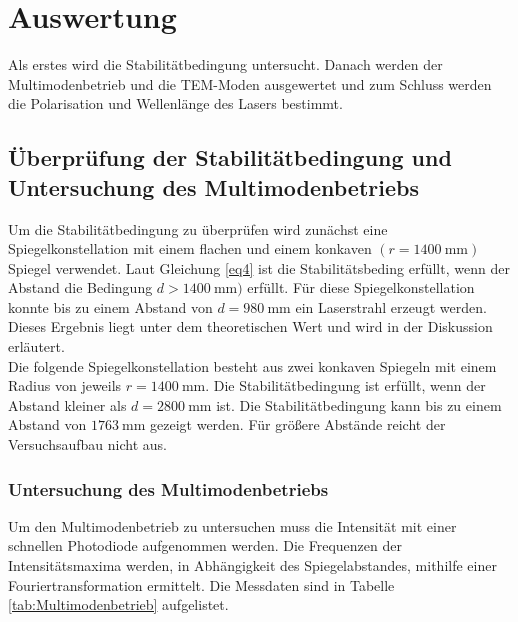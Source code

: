 \section{Auswertung}
\label{sec:Auswertung}

Als erstes wird die Stabilitätbedingung untersucht. Danach werden der 
Multimodenbetrieb und die TEM-Moden ausgewertet und zum Schluss werden 
die Polarisation und Wellenlänge des Lasers bestimmt.

\subsection{Überprüfung der Stabilitätbedingung und Untersuchung des Multimodenbetriebs}

Um die Stabilitätbedingung zu überprüfen wird zunächst eine Spiegelkonstellation mit einem flachen 
und einem konkaven $(r=\SI{1400}{\milli\meter})$ Spiegel verwendet. Laut Gleichung \eqref{eq4} ist die 
Stabilitätsbeding erfüllt, wenn der Abstand die Bedingung $d>\SI{1400}{\milli\meter})$ erfüllt.
Für diese Spiegelkonstellation konnte bis zu einem Abstand von $d=\SI{980}{\milli\meter}$ ein Laserstrahl erzeugt werden.
Dieses Ergebnis liegt unter dem theoretischen Wert und wird in der Diskussion erläutert.\\
Die folgende Spiegelkonstellation besteht aus zwei konkaven Spiegeln mit einem Radius von jeweils $r=\SI{1400}{\milli\meter}$.
Die Stabilitätbedingung ist erfüllt, wenn der Abstand kleiner als $d = \SI{2800}{\milli\meter}$ ist. 
Die Stabilitätbedingung kann bis zu einem Abstand von $\SI{1763}{\milli\meter}$ gezeigt werden. Für größere 
Abstände reicht der Versuchsaufbau nicht aus.

\subsubsection{Untersuchung des Multimodenbetriebs}

Um den Multimodenbetrieb zu untersuchen muss die Intensität mit einer schnellen Photodiode aufgenommen werden. Die 
Frequenzen der Intensitätsmaxima werden, in Abhängigkeit des Spiegelabstandes, mithilfe einer Fouriertransformation ermittelt. 
Die Messdaten sind in Tabelle \ref{tab:Multimodenbetrieb} aufgelistet.

